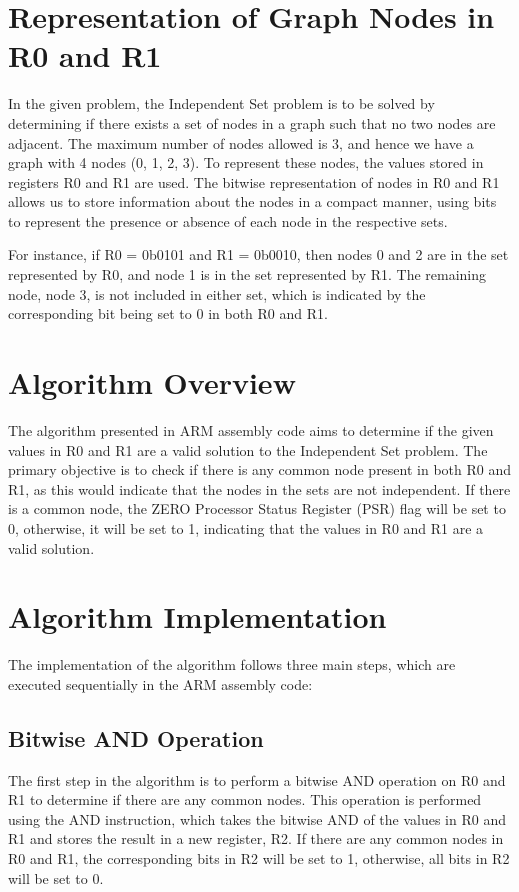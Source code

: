 \section{Representation of Graph Nodes in R0 and R1}

In the given problem, the Independent Set problem is to be solved by determining if there exists a set of nodes in a graph such that no two nodes are adjacent. The maximum number of nodes allowed is 3, and hence we have a graph with 4 nodes (0, 1, 2, 3). To represent these nodes, the values stored in registers R0 and R1 are used. The bitwise representation of nodes in R0 and R1 allows us to store information about the nodes in a compact manner, using bits to represent the presence or absence of each node in the respective sets.

For instance, if R0 = 0b0101 and R1 = 0b0010, then nodes 0 and 2 are in the set represented by R0, and node 1 is in the set represented by R1. The remaining node, node 3, is not included in either set, which is indicated by the corresponding bit being set to 0 in both R0 and R1.

\section{Algorithm Overview}

The algorithm presented in ARM assembly code aims to determine if the given values in R0 and R1 are a valid solution to the Independent Set problem. The primary objective is to check if there is any common node present in both R0 and R1, as this would indicate that the nodes in the sets are not independent. If there is a common node, the ZERO Processor Status Register (PSR) flag will be set to 0, otherwise, it will be set to 1, indicating that the values in R0 and R1 are a valid solution.

\section{Algorithm Implementation}

The implementation of the algorithm follows three main steps, which are executed sequentially in the ARM assembly code:

\subsection{Bitwise AND Operation}

The first step in the algorithm is to perform a bitwise AND operation on R0 and R1 to determine if there are any common nodes. This operation is performed using the AND instruction, which takes the bitwise AND of the values in R0 and R1 and stores the result in a new register, R2. If there are any common nodes in R0 and R1, the corresponding bits in R2 will be set to 1, otherwise, all bits in R2 will be set to 0.

